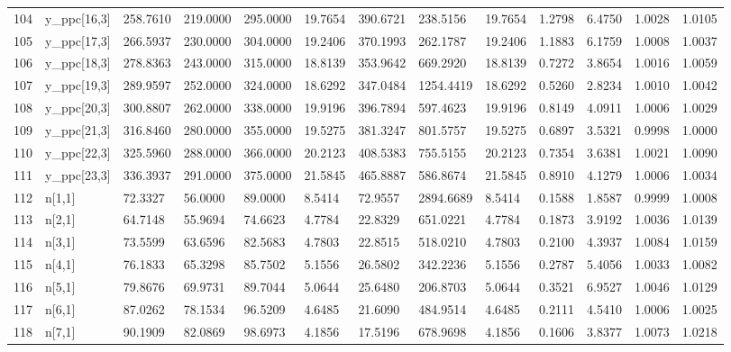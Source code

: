 \begin{table}[ht]
\begin{tabular}{rllllllllllll}
  104 & y\_ppc[16,3] & 258.7610 &  219.0000 & 295.0000 &  19.7654 &   390.6721 &  238.5156 &  19.7654 &  1.2798 &  6.4750 & 1.0028 &  1.0105 \\ 
  105 & y\_ppc[17,3] & 266.5937 &  230.0000 & 304.0000 &  19.2406 &   370.1993 &  262.1787 &  19.2406 &  1.1883 &  6.1759 & 1.0008 &  1.0037 \\ 
  106 & y\_ppc[18,3] & 278.8363 &  243.0000 & 315.0000 &  18.8139 &   353.9642 &  669.2920 &  18.8139 &  0.7272 &  3.8654 & 1.0016 &  1.0059 \\ 
  107 & y\_ppc[19,3] & 289.9597 &  252.0000 & 324.0000 &  18.6292 &   347.0484 & 1254.4419 &  18.6292 &  0.5260 &  2.8234 & 1.0010 &  1.0042 \\ 
  108 & y\_ppc[20,3] & 300.8807 &  262.0000 & 338.0000 &  19.9196 &   396.7894 &  597.4623 &  19.9196 &  0.8149 &  4.0911 & 1.0006 &  1.0029 \\ 
  109 & y\_ppc[21,3] & 316.8460 &  280.0000 & 355.0000 &  19.5275 &   381.3247 &  801.5757 &  19.5275 &  0.6897 &  3.5321 & 0.9998 &  1.0000 \\ 
  110 & y\_ppc[22,3] & 325.5960 &  288.0000 & 366.0000 &  20.2123 &   408.5383 &  755.5155 &  20.2123 &  0.7354 &  3.6381 & 1.0021 &  1.0090 \\ 
  111 & y\_ppc[23,3] & 336.3937 &  291.0000 & 375.0000 &  21.5845 &   465.8887 &  586.8674 &  21.5845 &  0.8910 &  4.1279 & 1.0006 &  1.0034 \\ 
  112 & n[1,1] &  72.3327 &   56.0000 &  89.0000 &   8.5414 &    72.9557 & 2894.6689 &   8.5414 &  0.1588 &  1.8587 & 0.9999 &  1.0008 \\ 
  113 & n[2,1] &  64.7148 &   55.9694 &  74.6623 &   4.7784 &    22.8329 &  651.0221 &   4.7784 &  0.1873 &  3.9192 & 1.0036 &  1.0139 \\ 
  114 & n[3,1] &  73.5599 &   63.6596 &  82.5683 &   4.7803 &    22.8515 &  518.0210 &   4.7803 &  0.2100 &  4.3937 & 1.0084 &  1.0159 \\ 
  115 & n[4,1] &  76.1833 &   65.3298 &  85.7502 &   5.1556 &    26.5802 &  342.2236 &   5.1556 &  0.2787 &  5.4056 & 1.0033 &  1.0082 \\ 
  116 & n[5,1] &  79.8676 &   69.9731 &  89.7044 &   5.0644 &    25.6480 &  206.8703 &   5.0644 &  0.3521 &  6.9527 & 1.0046 &  1.0129 \\ 
  117 & n[6,1] &  87.0262 &   78.1534 &  96.5209 &   4.6485 &    21.6090 &  484.9514 &   4.6485 &  0.2111 &  4.5410 & 1.0006 &  1.0025 \\ 
  118 & n[7,1] &  90.1909 &   82.0869 &  98.6973 &   4.1856 &    17.5196 &  678.9698 &   4.1856 &  0.1606 &  3.8377 & 1.0073 &  1.0218 \\ 

\end{tabular}
\end{table}
